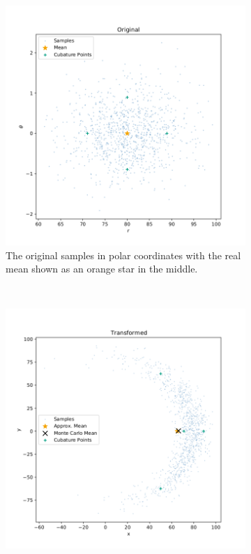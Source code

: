 	\begin{figure}  %
		\centering
		\begin{subfigure}[t]{0.5\linewidth}
			\centering
			\includegraphics[width = \linewidth]{figures/inference/cubature/spherical-radial-cubature-original.png}
			\caption[Original samples in polar coordinates to illustrate cubature rules]{The original samples in polar coordinates with the real mean shown as an orange star in the middle.}
		\end{subfigure}%
		~
		\begin{subfigure}[t]{0.5\linewidth}
			\centering
			\includegraphics[width = \linewidth]{figures/inference/cubature/spherical-radial-cubature-transformed.png}

\end{subfigure}
\end{figure}
